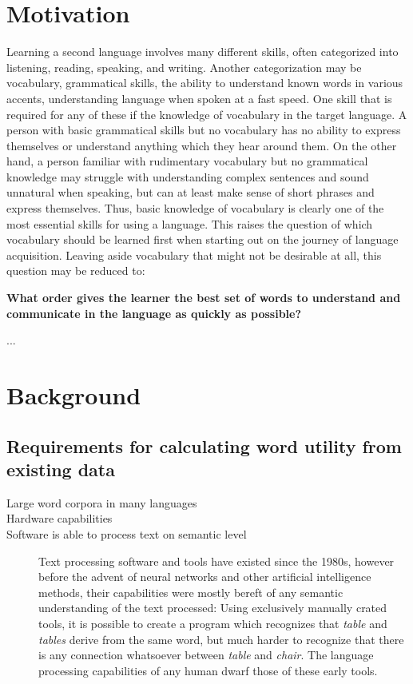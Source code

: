\section{Motivation}
Learning a second language involves many different skills, often categorized into listening, reading, speaking, and writing.
Another categorization may be vocabulary, grammatical skills, the ability to understand known words in various accents, understanding language when spoken at a fast speed.
One skill that is required for any of these if the knowledge of vocabulary in the target language.
A person with basic grammatical skills but no vocabulary has no ability to express themselves or understand anything which they hear around them.
On the other hand, a person familiar with rudimentary vocabulary but no grammatical knowledge may struggle with understanding complex sentences and sound unnatural when speaking, but can at least make sense of short phrases and express themselves.
Thus, basic knowledge of vocabulary is clearly one of the most essential skills for using a language.
This raises the question of which vocabulary should be learned first when starting out on the journey of language acquisition.
Leaving aside vocabulary that might not be desirable at all, this question may be reduced to:

\textbf{What order gives the learner the best set of words to understand and communicate in the language as quickly as possible?}


...

\section{Background}
\subsection{Requirements for calculating word utility from existing data}

\begin{description}
	\item [Large word corpora in many languages]
	\item [Hardware capabilities]
    \item [Software is able to process text on semantic level]
	      Text processing software and tools have existed since the 1980s, however before the advent of neural networks and other artificial intelligence methods, their capabilities were mostly bereft of any semantic understanding of the text processed: Using exclusively manually crated tools, it is possible to create a program which recognizes that \textit{table} and \textit{tables} derive from the same word, but much harder to recognize that there is any connection whatsoever between \textit{table} and \textit{chair}. The language processing capabilities of any human dwarf those of these early tools.
\end{description}

